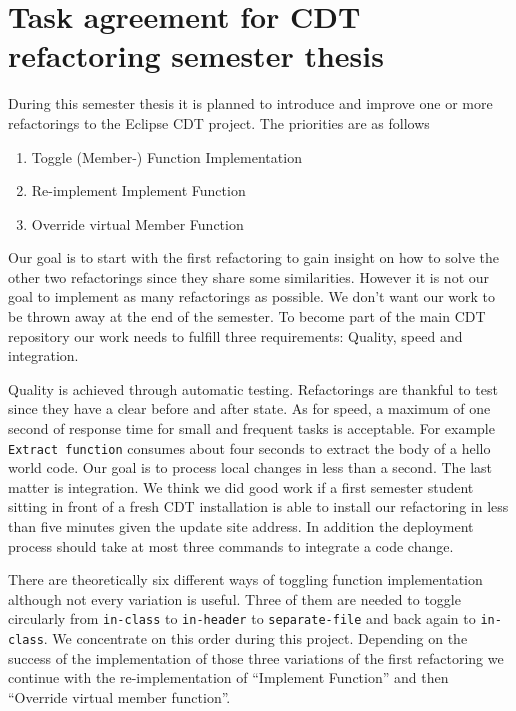 \documentclass[a4paper,10pt]{scrreprt}
\begin{document}
\section*{Task agreement for CDT refactoring semester thesis}

During this semester thesis it is planned to introduce and improve one or more
refactorings to the Eclipse CDT project. The priorities are as follows

\begin{enumerate}
\item Toggle (Member-) Function Implementation
\item Re-implement Implement Function
\item Override virtual Member Function
\end{enumerate}

Our goal is to start with the first refactoring to gain insight on how to solve
the other two refactorings since they share some similarities. However it is not
our goal to implement as many refactorings as possible. We don't want our work
to be thrown away at the end of the semester. To become part of the main CDT
repository our work needs to fulfill three requirements: Quality, speed and
integration. 

Quality is achieved through automatic testing. Refactorings are thankful to test
since they have a clear before and after state. As for speed, a maximum of one
second of response time for small and frequent tasks is
acceptable. For example \texttt{Extract function} consumes about four seconds to
extract the body of a hello world code. Our goal is to process local changes in
less than a second. The last matter is integration. We think we did good work if
a first semester student sitting in front of a fresh CDT installation is able to
install our refactoring in less than five minutes given the update site address.
In addition the deployment process should take at most three commands to
integrate a code change.\newline

There are theoretically six different ways of toggling function implementation
although not every variation is useful. Three of them are needed to toggle
circularly from \texttt{in-class} to \texttt{in-header} to
\texttt{separate-file}  and back again to \texttt{in-class}. We concentrate on
this order during this project.\newline
Depending on the success of the implementation of those three variations of the
first refactoring we continue with the re-implementation of  ``Implement
Function'' and then ``Override virtual member function''.
\end{document}
